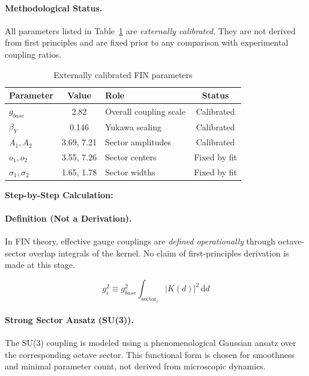 \documentclass[11pt,a4paper]{book}
\theoremstyle{remark}
\begin{document}
\paragraph{Methodological Status.}
All parameters listed in Table~\ref{tab:calibrated-params} are \textit{externally calibrated}.
They are not derived from first principles and are fixed prior to any comparison
with experimental coupling ratios.

\begin{table}[H]
\centering
\caption{Externally calibrated FIN parameters}
\label{tab:calibrated-params}
\begin{tabular}{|l|c|l|c|}
\hline
\textbf{Parameter} & \textbf{Value} & \textbf{Role} & \textbf{Status} \\
\hline
$g_{base}$ & 2.82 & Overall coupling scale & Calibrated \\
$\beta_Y$ & 0.146 & Yukawa scaling & Calibrated \\
$A_1, A_2$ & 3.69, 7.21 & Sector amplitudes & Calibrated \\
$o_1, o_2$ & 3.55, 7.26 & Sector centers & Fixed by fit \\
$\sigma_1, \sigma_2$ & 1.65, 1.78 & Sector widths & Fixed by fit \\
\hline
\end{tabular}
\end{table}

\textbf{Step-by-Step Calculation:}

\paragraph{Definition (Not a Derivation).}
In FIN theory, effective gauge couplings are \textit{defined operationally}
through octave-sector overlap integrals of the kernel.
No claim of first-principles derivation is made at this stage.

\begin{equation}
g_i^2 \equiv g_{base}^2 \int_{\text{sector}_i} |K(d)|^2 \, \mathrm{d}d
\label{eq:gauge-definition}
\end{equation}

\paragraph{Strong Sector Ansatz (SU(3)).}
The SU(3) coupling is modeled using a phenomenological Gaussian ansatz
over the corresponding octave sector.
This functional form is chosen for smoothness and minimal parameter count,
not derived from microscopic dynamics.
\end{document}
